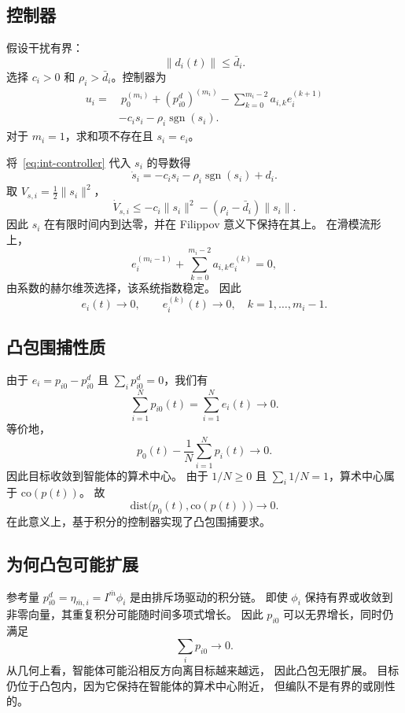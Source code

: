 \subsection{控制器}

假设干扰有界：
\[
    \|d_i(t)\|\le\bar d_i .
\]
选择 $c_i>0$ 和 $\rho_i>\bar d_i$。控制器为
\begin{equation}\label{eq:int-controller}
\begin{aligned}
    u_i
    =&\ p_0^{(m_i)}+(p_{i0}^{d})^{(m_i)}
       -\sum_{k=0}^{m_i-2}a_{i,k}e_i^{(k+1)}\\
     &-c_i s_i-\rho_i\operatorname{sgn}(s_i).
\end{aligned}
\end{equation}
对于 $m_i=1$，求和项不存在且 $s_i=e_i$。

将~\eqref{eq:int-controller} 代入 $s_i$ 的导数得
\[
    \dot s_i=-c_i s_i-\rho_i\operatorname{sgn}(s_i)+d_i.
\]
取 $V_{s,i}=\frac12\|s_i\|^2$，
\[
    \dot V_{s,i}
    \le -c_i\|s_i\|^2-(\rho_i-\bar d_i)\|s_i\|.
\]
因此 $s_i$ 在有限时间内到达零，并在 Filippov 意义下保持在其上。
在滑模流形上，
\[
    e_i^{(m_i-1)}
    +\sum_{k=0}^{m_i-2}a_{i,k}e_i^{(k)}=0,
\]
由系数的赫尔维茨选择，该系统指数稳定。
因此
\[
    e_i(t)\to0,\qquad
    e_i^{(k)}(t)\to0,\quad k=1,\dots,m_i-1.
\]

\subsection{凸包围捕性质}

由于 $e_i=p_{i0}-p_{i0}^{d}$ 且 $\sum_i p_{i0}^{d}=0$，我们有
\[
    \sum_{i=1}^{N}p_{i0}(t)=\sum_{i=1}^{N}e_i(t)\to0.
\]
等价地，
\[
    p_0(t)-\frac1N\sum_{i=1}^{N}p_i(t)\to0.
\]
因此目标收敛到智能体的算术中心。
由于 $1/N\ge0$ 且 $\sum_i1/N=1$，算术中心属于 $\mathrm{co}(p(t))$。
故
\[
    \mathrm{dist}\bigl(p_0(t),\mathrm{co}(p(t))\bigr)\to0.
\]
在此意义上，基于积分的控制器实现了凸包围捕要求。

\subsection{为何凸包可能扩展}

参考量 $p_{i0}^{d}=\eta_{\bar m,i}=I^{\bar m}\phi_i$ 是由排斥场驱动的积分链。
即使 $\phi_i$ 保持有界或收敛到非零向量，其重复积分可能随时间多项式增长。
因此 $p_{i0}$ 可以无界增长，同时仍满足
\[
    \sum_i p_{i0}\to0.
\]
从几何上看，智能体可能沿相反方向离目标越来越远，
因此凸包无限扩展。
目标仍位于凸包内，因为它保持在智能体的算术中心附近，
但编队不是有界的或刚性的。

